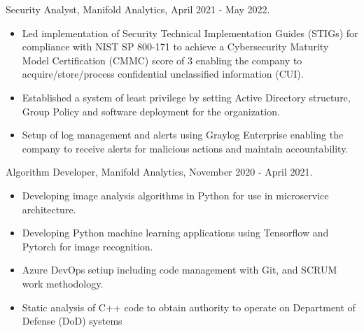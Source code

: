 \documentclass[12pt,a4paper]{article}
\begin{document}
Security Analyst, Manifold Analytics, April 2021 - May 2022.
\begin{itemize}
     \item Led implementation of Security Technical Implementation Guides (STIGs) for compliance with NIST SP 800-171 to achieve a Cybersecurity Maturity Model Certification (CMMC) score of 3 enabling the company to acquire/store/process confidential unclassified information (CUI).
     \item Established a system of least privilege by setting Active Directory structure, Group Policy and software deployment for the organization.
     \item Setup of log management and alerts using Graylog Enterprise enabling the company to receive alerts for malicious actions and maintain accountability.
\end{itemize}

Algorithm Developer, Manifold Analytics, November 2020 - April 2021.
\begin{itemize}
    \item Developing image analysis algorithms in Python for use in microservice architecture.
    \item Developing Python machine learning applications using Tensorflow and Pytorch for image recognition.
    \item Azure DevOps setiup including code management with Git, and SCRUM work methodology.
    \item Static analysis of C++ code to obtain authority to operate on Department of Defense (DoD) systems
\end{itemize}
    
    
\end{document}
